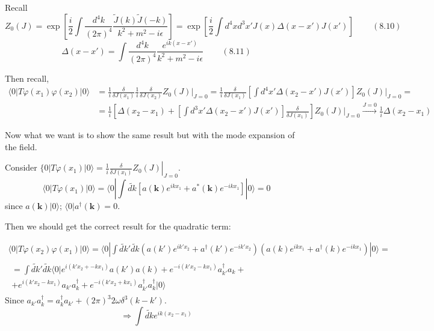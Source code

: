 \documentclass[twoside]{amsart}
\begin{document}
Recall 
\[
Z_0(J) = \exp{ \left[ \frac{i}{2} \int \frac{d^4k}{(2\pi)^4} \frac{\tilde{J}(k) \tilde{J}(-k)}{ k^2 + m^2 - i\epsilon } \right] } = \exp{ \left[ \frac{i}{2} \int d^4x d^3x' J(x) \Delta(x-x')J(x') \right] } \quad \quad \, (8.10)
\]
\[
\Delta(x-x') = \int \frac{d^4k}{(2\pi)^4} \frac{e^{ik(x-x')} }{k^2 + m^2 -i\epsilon} \quad \quad \, (8.11)
\]

Then recall,
\[
\begin{aligned}
  \langle 0 | T\varphi(x_1) \varphi(x_2) |0\rangle & = \frac{1}{i} \frac{\delta}{\delta J(x_1)}  \frac{1}{i} \frac{\delta}{\delta J(x_2)}  \left. Z_0(J) \right|_{J=0}  = \frac{1}{i} \frac{\delta}{\delta J(x_1)} \left[ \int d^4x' \Delta(x_2-x')J(x') \right] \left. Z_0(J) \right|_{J=0} = \\ 
  & = \frac{1}{i} \left[ \Delta(x_2 - x_1) + \left[ \int d^3x' \Delta(x_2-x') J(x') \right]\frac{\delta}{\delta J(x_1) } \right] \left. Z_0(J) \right|_{J=0} \xrightarrow{J=0} \frac{1}{i} \Delta(x_2 - x_1)
\end{aligned}
\]

Now what we want is to show the same result but with the mode expansion of the field.  \\

\hrulefill

Consider $\lbrace 0 | T\varphi(x_1) | 0 \rangle = \left. \frac{1}{i} \frac{ \delta}{ \delta J(x_1) } Z_0(J) \right|_{J=0}$.  
\[
\langle 0 | T\varphi(x_1) | 0 \rangle = \langle 0 | \int \widetilde{dk} [ a(\mathbf{k}) e^{ikx_1} + a^*(\mathbf{k}) e^{-ikx_1} ] |0 \rangle = 0 
\]
since $a(\mathbf{k}) | 0 \rangle$; $\langle 0 | a^{\dag}(\mathbf{k}) = 0$.  

Then we should get the correct result for the quadratic term:

\[
\begin{gathered}
  \langle 0 | T\varphi(x_2) \varphi(x_1) | 0 \rangle  = \langle 0 | \int \widetilde{dk}' \widetilde{dk} ( a(k')e^{ik'x_2} + a^{\dag}(k') e^{-ik'x_2} ) (a(k) e^{ikx_1} + a^{\dag}(k) e^{-ikx_1} ) |0 \rangle = \\
  \begin{gathered} = \int \widetilde{dk}' \widetilde{dk} \langle 0  |  e^{i(k'x_2+ -kx_1)} a(k') a(k) + e^{-i(k'x_2 - kx_1) } a^{\dag}_{k'} a_k  + \\ 
 + e^{i(k'x_2- kx_1) } a_{k'} a_k^{\dag} + e^{-i(k' x_2+ kx_1) } a_{k'}^{\dag} a_k^{\dag} | 0 \rangle 
\end{gathered}
\end{gathered}
\]
Since $a_{k'} a_k^{\dag} = a_k^{\dag} a_{k'} + (2\pi)^3 2\omega \delta^3(k-k')$.  
\[
\Longrightarrow \int \widetilde{dk} e^{ik(x_2-x_1)}
\]
\end{document}
